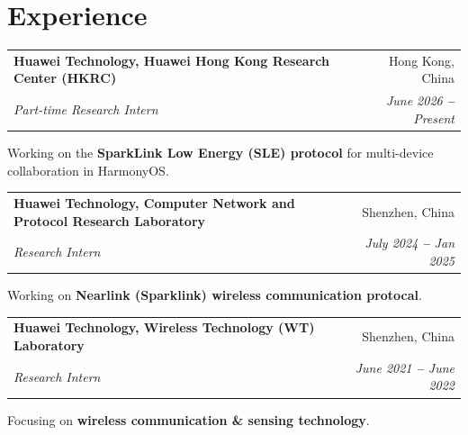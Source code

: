 \documentclass[letterpaper,10pt]{article}
\makeatletter
\newcommand{\resumeSubheading}[4]{
  \vspace{-2pt}\item
    \begin{tabular*}{0.97\textwidth}[t]{l@{\extracolsep{\fill}}r}
      \textbf{#1} & #2 \\
      \textit{\small#3} & \textit{\small #4} \\
    \end{tabular*}\vspace{-7pt}
}
\newcommand{\resumeSubHeadingListStart}{\begin{itemize}[leftmargin=0.15in, label={}]}
\newcommand{\resumeSubHeadingListEnd}{\end{itemize}\vspace{-5pt}}
\makeatother
\begin{document}
\section{Experience}
  \vspace{3pt}
  \resumeSubHeadingListStart
    \resumeSubheading
      {Huawei Technology, Huawei Hong Kong Research Center (HKRC)}{Hong Kong, China}
      {Part-time Research Intern}{June 2026 \textbf{--} Present}
      \resumeSubHeadingListStart
      \small{\item{Working on the \textbf{SparkLink Low Energy (SLE) protocol} for multi-device collaboration in HarmonyOS.}
      }
      \resumeSubHeadingListEnd
    \resumeSubheading
      {Huawei Technology, Computer Network and Protocol Research Laboratory}{Shenzhen, China}
      {Research Intern}{July 2024 \textbf{--} Jan 2025}
      \resumeSubHeadingListStart
      \small{\item{Working on \textbf{Nearlink (Sparklink) wireless communication protocal}. 
      }
      }
      \resumeSubHeadingListEnd  
    \resumeSubheading
      {Huawei Technology, Wireless Technology (WT) Laboratory}{Shenzhen, China}
      {Research Intern}{June 2021 \textbf{--} June 2022}
      \resumeSubHeadingListStart
      \small{\item{Focusing on \textbf{wireless communication \& sensing technology}. 
      }
      }
      \resumeSubHeadingListEnd  
  \resumeSubHeadingListEnd

\end{document}
